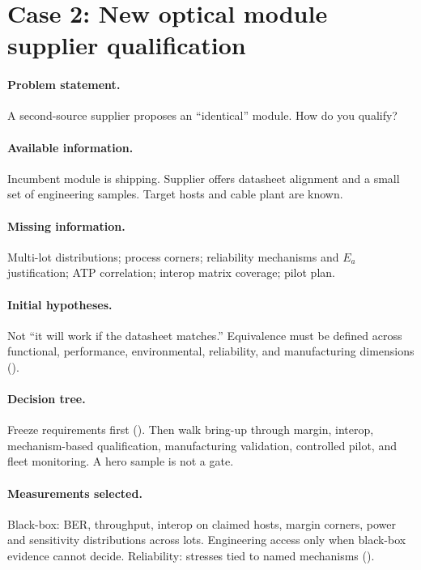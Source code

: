\section{Case 2: New optical module supplier qualification}
\label{sec:case-second-source}

\paragraph{Problem statement.}
A second-source supplier proposes an ``identical'' module. How do you qualify?

\paragraph{Available information.}
Incumbent module is shipping. Supplier offers datasheet alignment and a small
set of engineering samples. Target hosts and cable plant are known.

\paragraph{Missing information.}
Multi-lot distributions; process corners; reliability mechanisms and $E_a$
justification; ATP correlation; interop matrix coverage; pilot plan.

\paragraph{Initial hypotheses.}
Not ``it will work if the datasheet matches.'' Equivalence must be defined
across functional, performance, environmental, reliability, and manufacturing
dimensions ().

\paragraph{Decision tree.}
Freeze requirements first (). Then walk bring-up through
margin, interop, mechanism-based qualification, manufacturing validation,
controlled pilot, and fleet monitoring. A hero sample is not a gate.

\paragraph{Measurements selected.}
Black-box: BER, throughput, interop on claimed hosts, margin corners, power and
sensitivity distributions across lots. Engineering access only when black-box
evidence cannot decide. Reliability: stresses tied to named mechanisms
().

